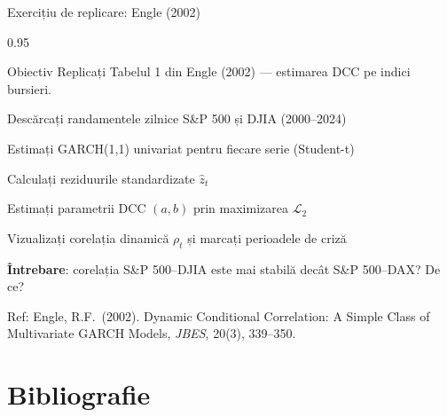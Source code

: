 \documentclass[9pt, aspectratio=169, t]{beamer}
\begin{document}
\begin{frame}{Exercițiu de replicare: Engle (2002)}
    \begin{cminipage}{0.95\textwidth}
        \begin{block}{Obiectiv}
            Replicați Tabelul 1 din Engle (2002) --- estimarea DCC pe indici bursieri.
        \end{block}
        \begin{enumerate}\setlength{\itemsep}{2pt}
            {\small
            \item Descărcați randamentele zilnice S\&P 500 și DJIA (2000--2024)
            \item Estimați GARCH(1,1) univariat pentru fiecare serie (Student-t)
            \item Calculați reziduurile standardizate $\hat{z}_t$
            \item Estimați parametrii DCC $(a, b)$ prin maximizarea $\mathcal{L}_2$
            \item Vizualizați corelația dinamică $\rho_t$ și marcați perioadele de criză
            \item \textbf{Întrebare}: corelația S\&P 500--DJIA este mai stabilă decât S\&P 500--DAX? De ce?
            }
        \end{enumerate}
        {\tiny Ref: Engle, R.F.\ (2002). Dynamic Conditional Correlation: A Simple Class of Multivariate GARCH Models, \textit{JBES}, 20(3), 339--350.}
    \end{cminipage}
\end{frame}

\section{Bibliografie}
\end{document}
